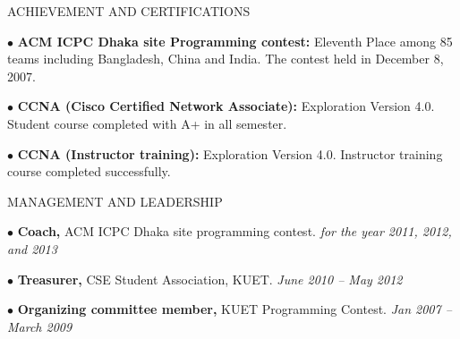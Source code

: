 \documentclass{resume} %
\begin{document}
\begin{rSection}{ACHIEVEMENT AND CERTIFICATIONS}

\begin{rSubsection}{}{}{}{}
\item[$\bullet$] {\bf ACM ICPC Dhaka site Programming contest:} Eleventh Place among 85 teams including Bangladesh, China and India. The contest held in December 8, 2007.
\item[$\bullet$] {\bf CCNA (Cisco Certified Network Associate):} Exploration Version 4.0. Student course completed with A+ in all semester.
\item[$\bullet$] {\bf CCNA (Instructor training):} Exploration Version 4.0. Instructor training course completed successfully.

\end{rSubsection}




\end{rSection}


\begin{rSection}{MANAGEMENT AND LEADERSHIP}

\begin{rSubsection}{}{}{}{}
\item[$\bullet$]{\bf Coach,} ACM ICPC Dhaka site programming contest. \hfill {\em for the year 2011, 2012, and 2013}
\item[$\bullet$] {\bf Treasurer,} CSE Student Association, KUET. \hfill {\em June 2010 – May 2012}
\item[$\bullet$] {\bf Organizing committee member,} KUET Programming Contest. \hfill {\em Jan 2007 – March 2009}
\end{rSubsection}

\end{rSection}






\end{document}
